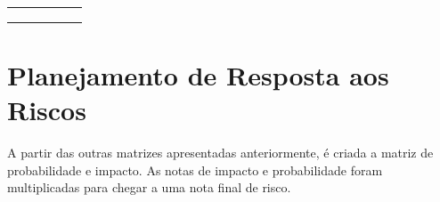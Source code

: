 \begin{table}[H]
\begin{tabular}{|c|c|c|c|c|c|}
                                          &                                                                                                                 &                                                                                           &                                                                                                      &                                                                                                                 &                                                                                                  \\ 
                                          &                                                                                                                 &                                                                                           &                                                                                                      &                                                                                                                 &      \\ 
                                          &                                                                                                                 &                                                                                           &                                                                                                      &                                                                                                                 &      \\ \hline
\end{tabular}
\end{table}

 \section{Planejamento de Resposta aos Riscos} %
 \label{sec:planejamento_de_resposta_aos_riscos}
 	
 	A partir das outras matrizes apresentadas anteriormente, é criada a matriz de probabilidade e impacto. As notas de impacto e probabilidade foram multiplicadas para chegar a uma nota final de risco.

